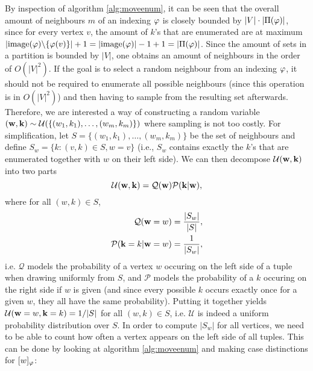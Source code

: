 By inspection of algorithm \ref{alg:moveenum}, it can be seen that the overall amount of neighbours $m$ of an indexing $\varphi$ is closely bounded by $|V|\cdot |\Pi(\varphi)|$, since for every vertex $v$, the amount of $k$'s that are enumerated are at maximum $|\mathrm{image}(\varphi)\backslash\{ \varphi(v) \}| + 1 = |\mathrm{image}(\varphi)|-1+1 = |\Pi(\varphi)|$. Since the amount of sets in a partition is bounded by $|V|$, one obtains an amount of neighbours in the order of $O(|V|^2)$. If the goal is to select a random neighbour from an indexing $\varphi$, it should not be required to enumerate all possible neighbours (since this operation is in $O(|V|^2)$) and then having to sample from the resulting set afterwards. Therefore, we are interested a way of constructing a random variable $({\bf w}, {\bf k}) \sim \mathcal{U}(\{ (w_1,k_1),\dots,(w_m,k_m) \})$ where sampling is not too costly. For simplification, let $S = \{ (w_1,k_1),\dots,(w_m,k_m) \}$ be the set of neighbours and define $S_w = \{ k : (v,k) \in S, w=v \}$ (i.e., $S_w$ contains exactly the $k$'s that are enumerated together with $w$ on their left side). We can then decompose $\mathcal{U}({\bf w}, {\bf k})$ into two parts
$$ \mathcal{U}({\bf w}, {\bf k}) = \mathcal{Q}({\bf w}) \mathcal{P}({\bf k}|{\bf w}), $$ where for all $(w,k) \in S$,
\begin{align*}
    \mathcal{Q}({\bf w} = w) &= \frac{| S_w |}{|S|},\\
    \mathcal{P}({\bf k} = k | {\bf w} = w) &= \frac{1}{| S_w |},
\end{align*}
i.e. $\mathcal{Q}$ models the probability of a vertex $w$ occuring on the left side of a tuple when drawing uniformly from $S$, and $\mathcal{P}$ models the probability of a $k$ occuring on the right side if $w$ is given (and since every possible $k$ occurs exactly once for a given $w$, they all have the same probability). Putting it together yields $\mathcal{U}({\bf w}=w, {\bf k}=k) = 1/|S|$ for all $(w,k) \in S$, i.e. $\mathcal{U}$ is indeed a uniform probability distribution over $S$. In order to compute $|S_w|$ for all vertices, we need to be able to count how often a vertex appears on the left side of all tuples. This can be done by looking at algorithm \ref{alg:moveenum} and making case distinctions for $[w]_\varphi$:
